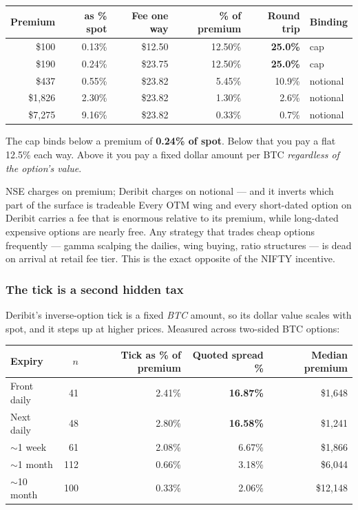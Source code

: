 \documentclass[11pt,a4paper]{article}
\begin{document}
\begin{center}
\begin{tabular}{@{}rrrrrl@{}}
\toprule
Premium & as \% spot & Fee one way & \% of premium & Round trip & Binding \\
\midrule
\$100   & 0.13\% & \$12.50 & 12.50\% & \textbf{25.0\%} & cap \\
\$190   & 0.24\% & \$23.75 & 12.50\% & \textbf{25.0\%} & cap \\
\$437   & 0.55\% & \$23.82 & 5.45\%  & 10.9\% & notional \\
\$1{,}826 & 2.30\% & \$23.82 & 1.30\%  & 2.6\%  & notional \\
\$7{,}275 & 9.16\% & \$23.82 & 0.33\%  & 0.7\%  & notional \\
\bottomrule
\end{tabular}
\end{center}

The cap binds below a premium of \textbf{0.24\% of spot}. Below that you pay a
flat 12.5\% each way. Above it you pay a fixed dollar amount per BTC \emph{regardless
of the option's value}.

\begin{keyfact}{NSE charges on premium; Deribit charges on notional --- and it inverts which part of the surface is tradeable}
Every OTM wing and every short-dated option on Deribit carries a fee that is
enormous relative to its premium, while long-dated expensive options are nearly
free. Any strategy that trades cheap options frequently --- gamma scalping the
dailies, wing buying, ratio structures --- is dead on arrival at retail fee tier.
This is the exact opposite of the NIFTY incentive.
\end{keyfact}

\subsubsection{The tick is a second hidden tax}

Deribit's inverse-option tick is a fixed \emph{BTC} amount, so its dollar value
scales with spot, and it steps up at higher prices. Measured across two-sided BTC
options:

\begin{center}
\begin{tabular}{@{}lrrrr@{}}
\toprule
Expiry & $n$ & Tick as \% of premium & Quoted spread \% & Median premium \\
\midrule
Front daily   & 41  & 2.41\% & \textbf{16.87\%} & \$1{,}648 \\
Next daily    & 48  & 2.80\% & \textbf{16.58\%} & \$1{,}241 \\
$\sim$1 week  & 61  & 2.08\% & 6.67\% & \$1{,}866 \\
$\sim$1 month & 112 & 0.66\% & 3.18\% & \$6{,}044 \\
$\sim$10 month& 100 & 0.33\% & 2.06\% & \$12{,}148 \\
\bottomrule
\end{tabular}
\end{center}
\end{document}
